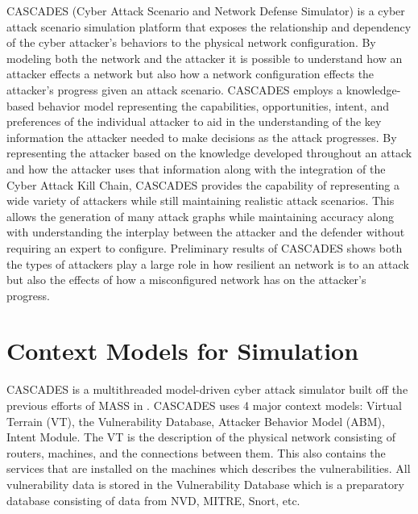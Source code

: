 \documentclass[conference]{IEEEtran}
\begin{document}
CASCADES (Cyber Attack Scenario and Network Defense Simulator) is a cyber attack scenario simulation platform that exposes the relationship and dependency of the cyber attacker's behaviors to the physical network configuration.   By modeling both the network and the attacker it is possible to understand how an attacker effects a network but also how a network configuration effects the attacker's progress given an attack scenario.  CASCADES employs a knowledge-based behavior model \cite{moskal2016knowledge} representing the capabilities, opportunities, intent, and preferences of the individual attacker to aid in the understanding of the key information the attacker needed to make decisions as the attack progresses.   By representing the attacker based on the knowledge developed throughout an attack and how the attacker uses that information along with the integration of the Cyber Attack Kill Chain, CASCADES provides the capability of representing a wide variety of attackers while still maintaining realistic attack scenarios.  This allows the generation of many attack graphs while maintaining accuracy along with understanding the interplay between the attacker and the defender without requiring an expert to configure.  Preliminary results of CASCADES shows both the types of attackers play a large role in how resilient an network is to an attack but also the effects of how a misconfigured network has on the attacker's progress. 


\section{Context Models for Simulation}
CASCADES is a multithreaded model-driven cyber attack simulator built off the previous efforts of MASS in \cite{moskal2014context}.  CASCADES uses 4 major context models: Virtual Terrain (VT), the Vulnerability Database, Attacker Behavior Model (ABM), Intent Module.   The VT is the description of the physical network consisting of routers, machines, and the connections between them.  This also contains the services that are installed on the machines which describes the vulnerabilities.  All vulnerability data is stored in the Vulnerability Database which is a preparatory database consisting of data from NVD, MITRE, Snort, etc.  
\end{document}
